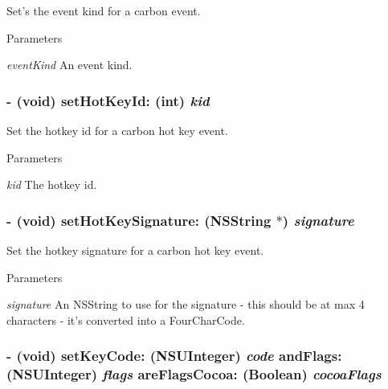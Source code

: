 Set's the event kind for a carbon event. 
\begin{DoxyParams}{Parameters}
\item[{\em eventKind}]An event kind. \end{DoxyParams}
\hypertarget{interface_g_d_carbon_event_aa9d6d67191763d051b809abaf50ec6b0}{
\subsubsection[{setHotKeyId:}]{\setlength{\rightskip}{0pt plus 5cm}-\/ (void) setHotKeyId: (int) {\em kid}}}
\label{interface_g_d_carbon_event_aa9d6d67191763d051b809abaf50ec6b0}


Set the hotkey id for a carbon hot key event. 
\begin{DoxyParams}{Parameters}
\item[{\em kid}]The hotkey id. \end{DoxyParams}
\hypertarget{interface_g_d_carbon_event_a06f5898aa490cf71399ea4f62f6b3d73}{
\subsubsection[{setHotKeySignature:}]{\setlength{\rightskip}{0pt plus 5cm}-\/ (void) setHotKeySignature: (NSString $\ast$) {\em signature}}}
\label{interface_g_d_carbon_event_a06f5898aa490cf71399ea4f62f6b3d73}


Set the hotkey signature for a carbon hot key event. 
\begin{DoxyParams}{Parameters}
\item[{\em signature}]An NSString to use for the signature -\/ this should be at max 4 characters -\/ it's converted into a FourCharCode. \end{DoxyParams}
\hypertarget{interface_g_d_carbon_event_a0140fa16d6e2987aa2437f6e56a8269d}{
\subsubsection[{setKeyCode:andFlags:areFlagsCocoa:}]{\setlength{\rightskip}{0pt plus 5cm}-\/ (void) setKeyCode: (NSUInteger) {\em code}\/ andFlags: (NSUInteger) {\em flags}\/ areFlagsCocoa: (Boolean) {\em cocoaFlags}}}
\label{interface_g_d_carbon_event_a0140fa16d6e2987aa2437f6e56a8269d}


